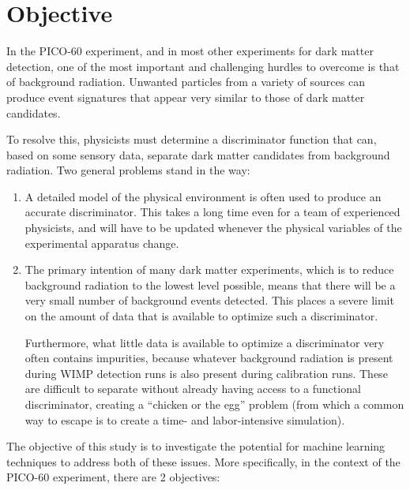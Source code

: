 \documentclass[10pt]{article}
\begin{document}
\section{Objective}

In the PICO-60 experiment, and in most other experiments for dark matter detection, one of the most important and challenging hurdles to overcome is that of background radiation. Unwanted particles from a variety of sources can produce event signatures that appear very similar to those of dark matter candidates.

To resolve this, physicists must determine a discriminator function that can, based on some sensory data, separate dark matter candidates from background radiation. Two general problems stand in the way:

\begin{enumerate}
    \item A detailed model of the physical environment is often used to produce an accurate discriminator. This takes a long time even for a team of experienced physicists, and will have to be updated whenever the physical variables of the experimental apparatus change.

    \item The primary intention of many dark matter experiments, which is to reduce background radiation to the lowest level possible, means that there will be a very small number of background events detected. This places a severe limit on the amount of data that is available to optimize such a discriminator.

    Furthermore, what little data is available to optimize a discriminator very often contains impurities, because whatever background radiation is present during WIMP detection runs is also present during calibration runs. These are difficult to separate without already having access to a functional discriminator, creating a ``chicken or the egg'' problem (from which a common way to escape is to create a time- and labor-intensive simulation).
\end{enumerate}

The objective of this study is to investigate the potential for machine learning techniques to address both of these issues. More specifically, in the context of the PICO-60 experiment, there are 2 objectives:
\end{document}

